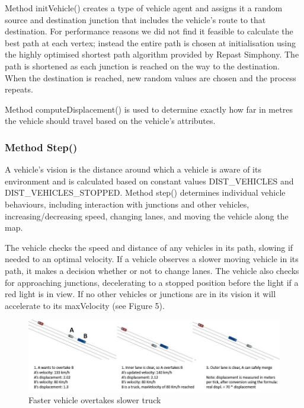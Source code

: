 \documentclass[11pt]{article}
\begin{document}
Method initVehicle() creates a type of vehicle agent and assigns it a random source and destination junction that includes the vehicle\textquoteright s route to that destination. For performance reasons we did not find it feasible to calculate the best path at each vertex; instead the entire path is chosen at initialisation using the highly optimised shortest path algorithm provided by Repast Simphony. The path is shortened as each junction is reached on the way to the destination. When the destination is reached, new random values are chosen and the process repeats.

Method computeDisplacement() is used to determine exactly how far in metres the vehicle should travel based on the vehicle\textquoteright s attributes. 


\subsubsection{Method Step()}


A vehicle\textquoteright s vision is the distance around which a vehicle is aware of its environment and is calculated based on constant values DIST{\_}VEHICLES and DIST{\_}VEHICLES{\_}STOPPED. Method step() determines individual vehicle behaviours, including interaction with junctions and other vehicles, increasing/decreasing speed, changing lanes, and moving the vehicle along the map.

The vehicle checks the speed and distance of any vehicles in its path, slowing if needed to an optimal velocity. If a vehicle observes a slower moving vehicle in its path, it makes a decision whether or not to change lanes. The vehicle also checks for approaching junctions, decelerating to a stopped position before the light if a red light is in view. If no other vehicles or junctions are in its vision it will accelerate to its maxVelocity (see Figure 5).
\\

\begin{figure}[H]
\begin{center}
\includegraphics[scale=0.4]{overtaking}
\caption{Faster vehicle overtakes slower truck}
\end{center}
\end{figure}
\end{document}

